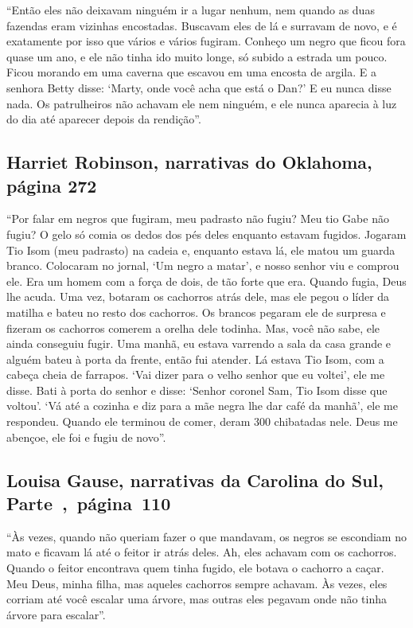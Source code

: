 ``Então eles não deixavam ninguém ir a lugar nenhum, nem quando as duas
fazendas eram vizinhas encostadas. Buscavam eles de lá e surravam de
novo, e é exatamente por isso que vários e vários fugiram. Conheço um
negro que ficou fora quase um ano, e ele não tinha ido muito longe, só
subido a estrada um pouco. Ficou morando em uma caverna que escavou em
uma encosta de argila. E a senhora Betty disse: `Marty, onde você acha
que está o Dan?' E eu nunca disse nada. Os patrulheiros não achavam ele
nem ninguém, e ele nunca aparecia à luz do dia até aparecer depois da
rendição''.

\subsection{Harriet Robinson, narrativas do Oklahoma, página 272}
\label{ref227}

``Por falar em negros que fugiram, meu padrasto não fugiu? Meu tio Gabe
não fugiu? O gelo só comia os dedos dos pés deles enquanto estavam
fugidos. Jogaram Tio Isom (meu padrasto) na cadeia e, enquanto estava
lá, ele matou um guarda branco. Colocaram no jornal, `Um negro a matar',
e nosso senhor viu e comprou ele. Era um homem com a força de dois, de
tão forte que era. Quando fugia, Deus lhe acuda. Uma vez, botaram os
cachorros atrás dele, mas ele pegou o líder da matilha e bateu no resto
dos cachorros. Os brancos pegaram ele de surpresa e fizeram os cachorros
comerem a orelha dele todinha. Mas, você não sabe, ele ainda conseguiu
fugir. Uma manhã, eu estava varrendo a sala da casa grande e alguém
bateu à porta da frente, então fui atender. Lá estava Tio Isom, com a
cabeça cheia de farrapos. `Vai dizer para o velho senhor que eu voltei',
ele me disse. Bati à porta do senhor e disse: `Senhor coronel Sam, Tio
Isom disse que voltou'. `Vá até a cozinha e diz para a mãe negra lhe dar
café da manhã', ele me respondeu. Quando ele terminou de comer, deram
300 chibatadas nele. Deus me abençoe, ele foi e fugiu de novo''.

\subsection{Louisa Gause, narrativas da Carolina do Sul, Parte~,~página~110}
\label{ref104}

``Às vezes, quando não queriam fazer o que mandavam, os negros se
escondiam no mato e ficavam lá até o feitor ir atrás deles. Ah, eles
achavam com os cachorros. Quando o feitor encontrava quem tinha fugido,
ele botava o cachorro a caçar. Meu Deus, minha filha, mas aqueles
cachorros sempre achavam. Às vezes, eles corriam até você escalar uma
árvore, mas outras eles pegavam onde não tinha árvore para escalar''.


